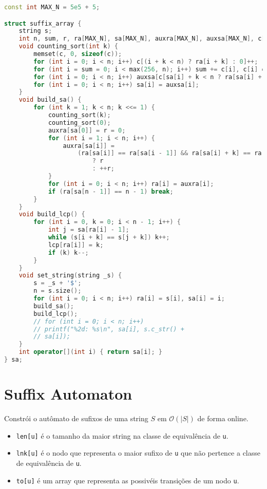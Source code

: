 \documentclass[10pt, a4paper, oneside]{book}
\begin{document}
\begin{lstlisting}[language=C++]
const int MAX_N = 5e5 + 5;

struct suffix_array {
    string s;
    int n, sum, r, ra[MAX_N], sa[MAX_N], auxra[MAX_N], auxsa[MAX_N], c[MAX_N], lcp[MAX_N];
    void counting_sort(int k) {
        memset(c, 0, sizeof(c));
        for (int i = 0; i < n; i++) c[(i + k < n) ? ra[i + k] : 0]++;
        for (int i = sum = 0; i < max(256, n); i++) sum += c[i], c[i] = sum - c[i];
        for (int i = 0; i < n; i++) auxsa[c[sa[i] + k < n ? ra[sa[i] + k] : 0]++] = sa[i];
        for (int i = 0; i < n; i++) sa[i] = auxsa[i];
    }
    void build_sa() {
        for (int k = 1; k < n; k <<= 1) {
            counting_sort(k);
            counting_sort(0);
            auxra[sa[0]] = r = 0;
            for (int i = 1; i < n; i++) {
                auxra[sa[i]] =
                    (ra[sa[i]] == ra[sa[i - 1]] && ra[sa[i] + k] == ra[sa[i - 1] + k])
                        ? r
                        : ++r;
            }
            for (int i = 0; i < n; i++) ra[i] = auxra[i];
            if (ra[sa[n - 1]] == n - 1) break;
        }
    }
    void build_lcp() {
        for (int i = 0, k = 0; i < n - 1; i++) {
            int j = sa[ra[i] - 1];
            while (s[i + k] == s[j + k]) k++;
            lcp[ra[i]] = k;
            if (k) k--;
        }
    }
    void set_string(string _s) {
        s = _s + '$';
        n = s.size();
        for (int i = 0; i < n; i++) ra[i] = s[i], sa[i] = i;
        build_sa();
        build_lcp();
        // for (int i = 0; i < n; i++)
        // printf("%2d: %s\n", sa[i], s.c_str() +
        // sa[i]);
    }
    int operator[](int i) { return sa[i]; }
} sa;
\end{lstlisting}
\hfill

\section{Suffix Automaton}


Constrói o autômato de sufixos de uma string $S$ em $\mathcal{O}(|S|)$ de forma online. 



\begin{itemize}
\item \texttt{len[u]} é o tamanho da maior string na classe de equivalência de \texttt{u}.
\item \texttt{lnk[u]} é o nodo que representa o maior sufixo de \texttt{u} que não pertence a classe de equivalência de \texttt{u}.
\item \texttt{to[u]} é um array que representa as possivéis transições de um nodo \texttt{u}.
\end{itemize}
\end{document}

